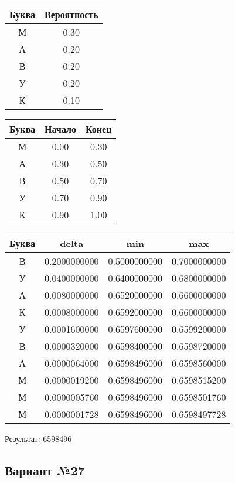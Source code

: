 \documentclass[a4paper, 12pt]{article}
\begin{document}
\begin{center}
 \begin{tabular}{ |c|c| } 
  \hline
     Буква & Вероятность \\ \hline
М & 0.30\\\hline
А & 0.20\\\hline
В & 0.20\\\hline
У & 0.20\\\hline
К & 0.10
\\ \hline \end{tabular}
\end{center}
\begin{center}
 \begin{tabular}{ |c|c|c| } 
  \hline
     Буква & Начало & Конец \\ \hline
М & 0.00 & 0.30\\\hline
А & 0.30 & 0.50\\\hline
В & 0.50 & 0.70\\\hline
У & 0.70 & 0.90\\\hline
К & 0.90 & 1.00
\\ \hline \end{tabular}
\end{center}
\begin{center}
 \begin{tabular}{ |c|c|c|c| } 
  \hline
     Буква & delta & min & max \\ \hline
В & 0.2000000000 & 0.5000000000 & 0.7000000000\\\hline
У & 0.0400000000 & 0.6400000000 & 0.6800000000\\\hline
А & 0.0080000000 & 0.6520000000 & 0.6600000000\\\hline
К & 0.0008000000 & 0.6592000000 & 0.6600000000\\\hline
У & 0.0001600000 & 0.6597600000 & 0.6599200000\\\hline
В & 0.0000320000 & 0.6598400000 & 0.6598720000\\\hline
А & 0.0000064000 & 0.6598496000 & 0.6598560000\\\hline
М & 0.0000019200 & 0.6598496000 & 0.6598515200\\\hline
М & 0.0000005760 & 0.6598496000 & 0.6598501760\\\hline
М & 0.0000001728 & 0.6598496000 & 0.6598497728
\\ \hline \end{tabular}
\end{center}
Результат: 6598496
\pagebreak
\subsection{Вариант №27}
\end{document}
